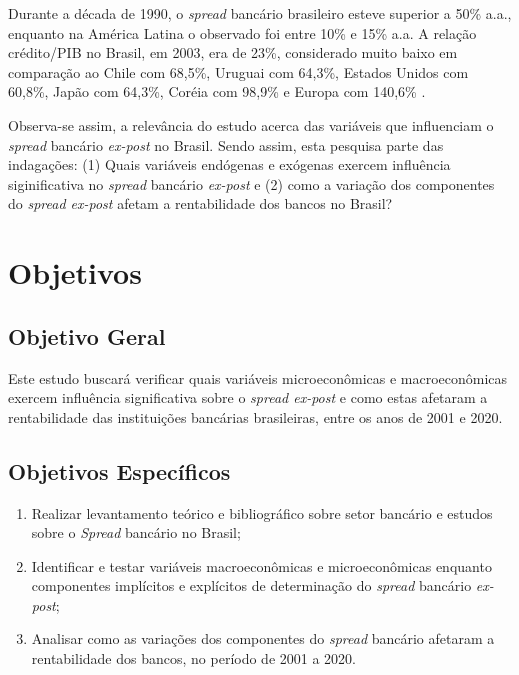 \documentclass[
  12pt,
  12pt,
  openright,
  oneside,
  a4paper,
  chapter=TITLE,
  section=TITLE,
  subsection=TITLE,
  subsubsection=TITLE,
  english,
  portugues,
  sumario=tradicional]{abntex2}
\providecommand{\tightlist}{%
  \setlength{\itemsep}{0pt}\setlength{\parskip}{0pt}}
\begin{document}
Durante a década de 1990, o \emph{spread} bancário brasileiro esteve superior a 50\% a.a., enquanto na América Latina o observado foi entre 10\% e 15\% a.a. A relação crédito/PIB no Brasil, em 2003, era de 23\%, considerado muito baixo em comparação ao Chile com 68,5\%, Uruguai com 64,3\%, Estados Unidos com 60,8\%, Japão com 64,3\%, Coréia com 98,9\% e Europa com 140,6\% \cite{camargo:2009, singh:2005}.

Observa-se assim, a relevância do estudo acerca das variáveis que influenciam o \emph{spread} bancário \emph{ex-post} no Brasil. Sendo assim, esta pesquisa parte das indagações: (1) Quais variáveis endógenas e exógenas exercem influência siginificativa no \emph{spread} bancário \emph{ex-post} e (2) como a variação dos componentes do \emph{spread ex-post} afetam a rentabilidade dos bancos no Brasil?

\section{Objetivos}

\subsection{Objetivo Geral}

Este estudo buscará verificar quais variáveis microeconômicas e macroeconômicas exercem influência significativa sobre o \emph{spread ex-post} e como estas afetaram a rentabilidade das instituições bancárias brasileiras, entre os anos de 2001 e 2020.

\subsection{Objetivos Específicos}

\begin{enumerate}
\def\labelenumi{\arabic{enumi}.}
\tightlist
\item
  Realizar levantamento teórico e bibliográfico sobre setor bancário e estudos sobre o \emph{Spread} bancário no Brasil;
\item
  Identificar e testar variáveis macroeconômicas e microeconômicas enquanto componentes implícitos e explícitos de determinação do \emph{spread} bancário \emph{ex-post};
\item
  Analisar como as variações dos componentes do \emph{spread} bancário afetaram a rentabilidade dos bancos, no período de 2001 a 2020.
\end{enumerate}
\end{document}
